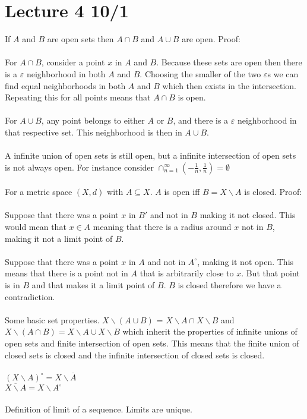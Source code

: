 \documentclass[12pt]{article}
\begin{document}
\section{Lecture 4 10/1}
If $A$ and $B$ are open sets then $A \cap B$ and $A \cup B$ are open. Proof:\\\\
For $A \cap B$, consider a point $x$ in $A$ and $B$. Because these sets are open then there is a $\varepsilon$ neighborhood in both $A$ and $B$. Choosing the smaller of the two $\varepsilon$s we can find equal neighborhoods in both $A$ and $B$ which then exists in the intersection. Repeating this for all points means that $A \cap B$ is open. \\\\
For $A \cup  B$, any point belongs to either $A$ or $B$, and there is a $\varepsilon$ neighborhood in that respective set. This neighborhood is then in $A \cup B$. \\\\
A infinite union of open sets is still open, but a infinite intersection of open sets is not always open. For instance consider $\cap_{n = 1}^\infty (-\frac 1 n, \frac 1 n) = \emptyset$\\\\
For a metric space $(X,d)$ with $A \subseteq X$. $A$ is open iff $B = X \backslash A$ is closed. Proof: \\\\
Suppose that there was a point $x$ in $B'$ and not in $B$ making it not closed. This would mean that $x \in A$ meaning that there is a radius around $x$ not in $B$, making it not a limit point of $B$. \\\\
Suppose that there was a point $x$ in $A$ and not in $A^\circ$, making it not open. This means that there is a point not in $A$ that is arbitrarily close to $x$. But that point is in $B$ and that makes it a limit point of $B$. $B$ is closed therefore we have a contradiction. \\\\
Some basic set properties. $X \backslash (A \cup B)$ = $X \backslash A \cap X \backslash B$ and $X \backslash (A \cap B) = X \backslash A \cup X \backslash B$ which inherit the properties of infinite unions of open sets and finite intersection of open sets. This means that the finite union of closed sets is closed and the infinite intersection of closed sets is closed. \\\\
$(X \backslash A)^\circ = X \backslash \overline{A}$\\
$\overline{X \backslash A} = X \backslash A^\circ$\\\\
Definition of limit of a sequence. Limits are unique.
\end{document}
